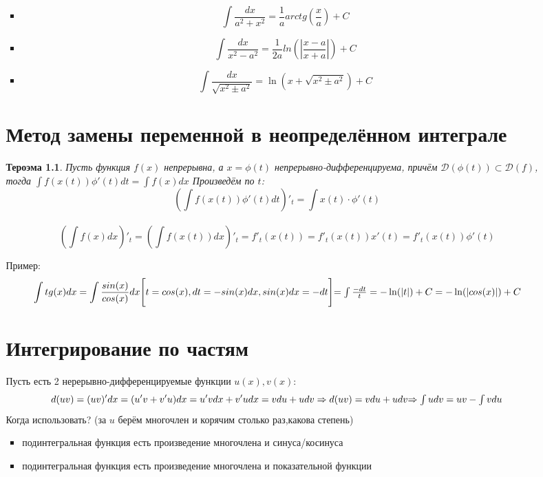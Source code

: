 \documentclass[oneside]{book}
\newtheorem{thm}{Тероэма}[chapter] %
\begin{document}
\begin{enumerate}
\begin{itemize}
\begin{enumerate}
\begin{itemize}
\begin{equation}
  \end{equation}
  \item \begin{equation}
    \int \frac{dx}{a^2 + x^2} = \frac{1}{a}arctg(\frac{x}{a}) + C
  \end{equation}
  \item \begin{equation}
    \int \frac{dx}{x^2 - a^2} = \frac{1}{2a}ln(|\frac{x - a}{x + a}|) + C
  \end{equation}
  \item \begin{equation}
    \int \frac{dx}{\sqrt{x^2 \pm a^2}} = \ln(x + \sqrt{x^2 \pm a^2}) + C
  \end{equation}
\end{itemize}

\chapter[Замен переменной]{Метод замены переменной в неопределённом интеграле}
\begin{thm}
  Пусть функция $f(x)$ непрерывна, а $x = \phi(t)$ непрерывно-дифференцируема, причём $\mathcal{D}(\phi(t)) \subset \mathcal{D}(f)$, тогда
  $\int f(x(t)) \phi'(t) dt = \int f(x) dx$ Произведём по $t$: $$
  (\int f(x(t)) \phi'(t) dt)'_t = \int x(t) \cdot \phi'(t) $$\\$$
  (\int f(x) dx)'_t = (\int f(x(t))dx)'_t = f'_t(x(t)) = f'_t(x(t))x'(t) = f'_t(x(t))\phi'(t)
  $$
\end{thm}
Пример:
\begin{equation}
  \int tg(x)dx = \int \frac{sin(x)}{cos(x)}dx \\
  \Bigg[t = cos(x), dt = -sin(x)dx, sin(x)dx = -dt \Bigg] $$\\$$ =
  \int \frac{-dt}{t} = -\ln(|t|)+C = -\ln(|cos(x)|) + C
\end{equation}

\chapter{Интегрирование по частям}
Пусть есть 2 нерерывно-дифференцируемые функции $u(x), v(x)$: \begin{equation}
  d(uv) = (uv)'dx = (u'v + v'u)dx = u'vdx + v'udx = vdu + udv \Rightarrow d(uv) = vdu + udv
  $\\$ \Rightarrow \int udv = uv - \int vdu
\end{equation}
Когда использовать?
(за $u$ берём многочлен и корячим столько раз,какова степень)
\begin{itemize}
  \item подинтегральная функция есть произведение многочлена и синуса/косинуса
  \item подинтегральная функция есть произведение многочлена и показательной функции
\end{itemize}





\end{enumerate}
\end{itemize}
\end{enumerate}
\end{document}
